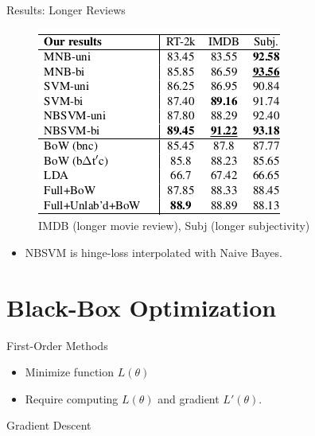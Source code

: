 \documentclass{beamer}
\begin{document}
\begin{frame}{Results: Longer Reviews}
  \begin{figure}
    \centering
    \includegraphics{svm}
    \caption{IMDB (longer movie review), Subj (longer subjectivity)}
  \end{figure}

  \begin{itemize}
  \item NBSVM is hinge-loss interpolated with Naive Bayes.
  \end{itemize}
\end{frame}



\section{Black-Box Optimization}

\begin{frame}{First-Order Methods}
  \begin{itemize}
  \item Minimize function $L(\theta)$
  \item Require computing $L(\theta)$ and gradient $L'(\theta)$.
  \end{itemize}
\end{frame}


\begin{frame}{Gradient Descent}
  \begin{figure}
    \begin{algorithmic}
      \EndFor{}
      \EndWhile{}
      \State{\Return{$\theta$}}
    \end{algorithmic}
  \end{figure}  
\end{frame}
\end{document}
